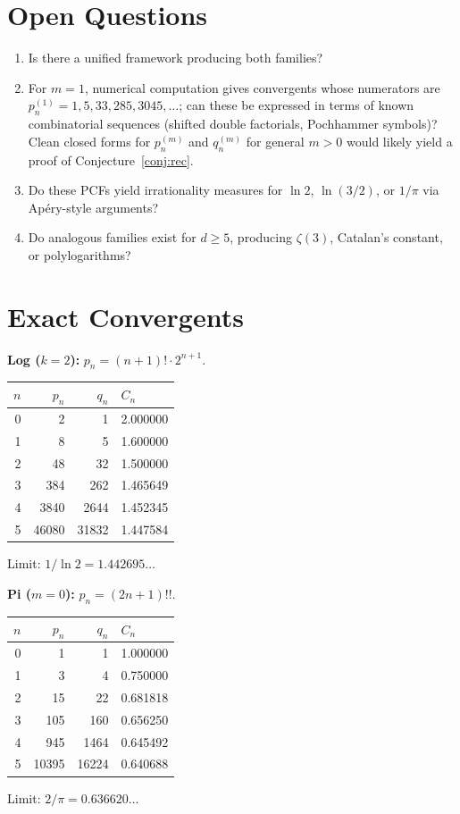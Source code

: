 \documentclass[11pt,a4paper]{article}
\theoremstyle{plain}
\theoremstyle{remark}
\begin{document}
\section{Open Questions}

\begin{enumerate}
\item Is there a unified framework producing both families?
\item For $m = 1$, numerical computation gives convergents whose
  numerators are $p_n^{(1)} = 1, 5, 33, 285, 3045, \ldots$;
  can these be expressed in terms of known combinatorial sequences
  (shifted double factorials, Pochhammer symbols)?
  Clean closed forms for $p_n^{(m)}$ and $q_n^{(m)}$ for general
  $m > 0$ would likely yield a proof of Conjecture~\ref{conj:rec}.
\item Do these PCFs yield irrationality measures for $\ln 2$,
  $\ln(3/2)$, or $1/\pi$ via Ap\'ery-style arguments?
\item Do analogous families exist for $d \ge 5$,
  producing $\zeta(3)$, Catalan's constant, or polylogarithms?
\end{enumerate}

\appendix
\section{Exact Convergents}\label{app:conv}

\textbf{Log ($k{=}2$):} $p_n = (n{+}1)!\cdot 2^{n+1}$.

\smallskip
\begin{center}
\begin{tabular}{@{}rrrl@{}}
\toprule
$n$ & $p_n$ & $q_n$ & $C_n$ \\
\midrule
0 & 2 & 1 & 2.000000 \\
1 & 8 & 5 & 1.600000 \\
2 & 48 & 32 & 1.500000 \\
3 & 384 & 262 & 1.465649 \\
4 & 3840 & 2644 & 1.452345 \\
5 & 46080 & 31832 & 1.447584 \\
\bottomrule
\end{tabular}
\end{center}
\smallskip\noindent Limit: $1/\ln 2 = 1.442695\ldots$

\medskip
\textbf{Pi ($m{=}0$):} $p_n = (2n{+}1)!!$.

\smallskip
\begin{center}
\begin{tabular}{@{}rrrl@{}}
\toprule
$n$ & $p_n$ & $q_n$ & $C_n$ \\
\midrule
0 & 1 & 1 & 1.000000 \\
1 & 3 & 4 & 0.750000 \\
2 & 15 & 22 & 0.681818 \\
3 & 105 & 160 & 0.656250 \\
4 & 945 & 1464 & 0.645492 \\
5 & 10395 & 16224 & 0.640688 \\
\bottomrule
\end{tabular}
\end{center}
\smallskip\noindent Limit: $2/\pi = 0.636620\ldots$
\end{document}
